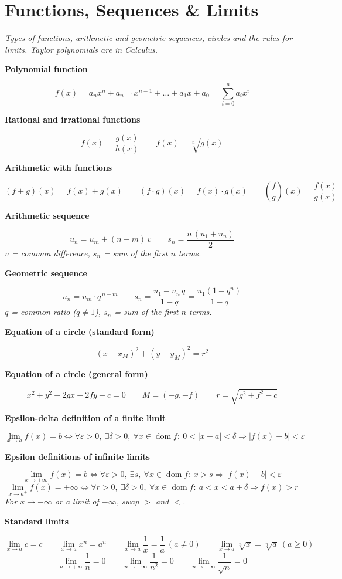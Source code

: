 \documentclass[11pt]{article}
\newcommand{\sect}[2]{\section*{\color{#1}#2}}
\newcommand{\sub}[1]{\par\medskip\textbf{#1}\par}
\newcommand{\expl}[1]{{\color{gray}\itshape #1}\par}
\begin{document}
\sect{cFun}{Functions, Sequences \& Limits}
\expl{Types of functions, arithmetic and geometric sequences, circles and the rules for limits. Taylor polynomials are in Calculus.}

\sub{Polynomial function}
\[ f(x) = a_n x^n + a_{n-1}x^{n-1} + \dots + a_1 x + a_0 = \sum_{i=0}^{n} a_i x^i \]

\sub{Rational and irrational functions}
\[ f(x) = \frac{g(x)}{h(x)} \qquad f(x) = \sqrt[n]{g(x)} \]

\sub{Arithmetic with functions}
\[ (f + g)(x) = f(x) + g(x) \qquad (f\cdot g)(x) = f(x)\cdot g(x) \qquad \left(\frac{f}{g}\right)(x) = \frac{f(x)}{g(x)} \]

\sub{Arithmetic sequence}
\[ u_n = u_m + (n - m)\,v \qquad s_n = \frac{n\,(u_1 + u_n)}{2} \]
\expl{$v$ = common difference, $s_n$ = sum of the first $n$ terms.}

\sub{Geometric sequence}
\[ u_n = u_m\cdot q^{\,n-m} \qquad s_n = \frac{u_1 - u_n\,q}{1 - q} = \frac{u_1\left(1 - q^n\right)}{1 - q} \]
\expl{$q$ = common ratio ($q \ne 1$), $s_n$ = sum of the first $n$ terms.}

\sub{Equation of a circle (standard form)}
\[ (x - x_M)^2 + (y - y_M)^2 = r^2 \]

\sub{Equation of a circle (general form)}
\[ x^2 + y^2 + 2gx + 2fy + c = 0 \qquad M = (-g, -f) \qquad r = \sqrt{g^2 + f^2 - c} \]

\sub{Epsilon-delta definition of a finite limit}
\[ \lim_{x\to a} f(x) = b \iff \forall \varepsilon > 0,\ \exists \delta > 0,\ \forall x \in \operatorname{dom} f:\ 0 < |x - a| < \delta \Rightarrow |f(x) - b| < \varepsilon \]

\sub{Epsilon definitions of infinite limits}
\[ \lim_{x\to +\infty} f(x) = b \iff \forall \varepsilon > 0,\ \exists s,\ \forall x \in \operatorname{dom} f:\ x > s \Rightarrow |f(x) - b| < \varepsilon \]
\[ \lim_{x\to a^+} f(x) = +\infty \iff \forall r > 0,\ \exists \delta > 0,\ \forall x \in \operatorname{dom} f:\ a < x < a + \delta \Rightarrow f(x) > r \]
\expl{For $x \to -\infty$ or a limit of $-\infty$, swap $>$ and $<$.}

\sub{Standard limits}
\[ \lim_{x\to a} c = c \qquad \lim_{x\to a} x^n = a^n \qquad \lim_{x\to a} \frac{1}{x} = \frac{1}{a}\ (a \ne 0) \qquad \lim_{x\to a} \sqrt[n]{x} = \sqrt[n]{a}\ (a \ge 0) \]
\[ \lim_{n\to +\infty} \frac{1}{n} = 0 \qquad \lim_{n\to +\infty} \frac{1}{n^2} = 0 \qquad \lim_{n\to +\infty} \frac{1}{\sqrt n} = 0 \]
\end{document}
